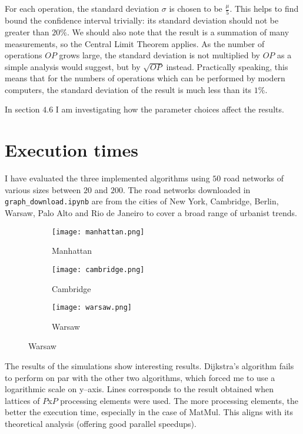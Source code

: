 \documentclass[12pt,a4paper,twoside,openright]{report}
\begin{document}
For each operation, the standard deviation $\sigma$ is chosen to be $\frac{\mu}{5}$. This helps to find bound the confidence interval trivially: its standard deviation should not be greater than $20\%$. We should also note that the result is a summation of many measurements, so the Central Limit Theorem \cite{central} applies. As the number of operations $OP$ grows large, the standard deviation is not multiplied by $OP$ as a simple analysis would suggest, but by $\sqrt{OP}$ instead. Practically speaking, this means that for the numbers of operations which can be performed by modern computers, the standard deviation of the result is much less than its $1\%$. 

In section $4.6$ I am investigating how the parameter choices affect the results. 

\section{Execution times}
I have evaluated the three implemented algorithms using $50$ road networks of various sizes between $20$ and $200$. The road networks downloaded in \texttt{graph\_download.ipynb} are from the cities of New York, Cambridge, Berlin, Warsaw, Palo Alto and Rio de Janeiro to cover a broad range of urbanist trends.

\begin{figure}[h]
\caption{Comparison of various road networks}
  \begin{subfigure}{5.2cm}
    \centering\texttt{[image: manhattan.png]}
    \caption{Manhattan}
  \end{subfigure}
  \begin{subfigure}{5.2cm}
    \centering\texttt{[image: cambridge.png]}
    \caption{Cambridge}
  \end{subfigure}
  \begin{subfigure}{5.2cm}
    \centering\texttt{[image: warsaw.png]}
    \caption{Warsaw}
  \end{subfigure}
\end{figure}

The results of the simulations show interesting results. Dijkstra's algorithm fails to perform on par with the other two algorithms, which forced me to use a logarithmic scale on y--axis. Lines corresponds to the result obtained when lattices of $P$x$P$ processing elements were used. The more processing elements, the better the execution time, especially in the case of MatMul. This aligns with its theoretical analysis (offering good parallel speedups). 
\end{document}
